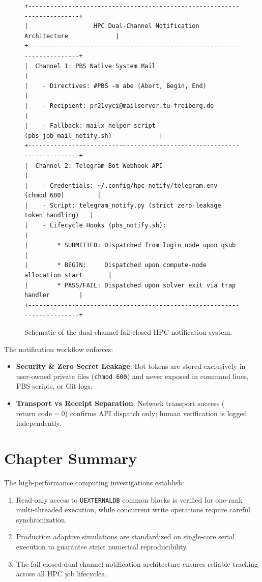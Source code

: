 \begin{figure}[htbp]
\centering
\small
\begin{verbatim}
+-------------------------------------------------------------------------+
|                  HPC Dual-Channel Notification Architecture             |
+-------------------------------------------------------------------------+
|  Channel 1: PBS Native System Mail                                      |
|    - Directives: #PBS -m abe (Abort, Begin, End)                        |
|    - Recipient: pr21vyci@mailserver.tu-freiberg.de                      |
|    - Fallback: mailx helper script (pbs_job_mail_notify.sh)             |
+-------------------------------------------------------------------------+
|  Channel 2: Telegram Bot Webhook API                                    |
|    - Credentials: ~/.config/hpc-notify/telegram.env (chmod 600)         |
|    - Script: telegram_notify.py (strict zero-leakage token handling)   |
|    - Lifecycle Hooks (pbs_notify.sh):                                   |
|        * SUBMITTED: Dispatched from login node upon qsub                |
|        * BEGIN:     Dispatched upon compute-node allocation start       |
|        * PASS/FAIL: Dispatched upon solver exit via trap handler        |
+-------------------------------------------------------------------------+
\end{verbatim}
\caption[Schematic of the dual-channel fail-closed HPC notification system.]{Schematic of the dual-channel fail-closed HPC notification system.}
\label{fig:notification_architecture}
\end{figure}

The notification workflow enforces:
\begin{itemize}
    \item \textbf{Security \& Zero Secret Leakage}: Bot tokens are stored exclusively in user-owned private files (\texttt{chmod 600}) and never exposed in command lines, PBS scripts, or Git logs.
    \item \textbf{Transport vs Receipt Separation}: Network transport success ($\text{return code} = 0$) confirms API dispatch only; human verification is logged independently.
\end{itemize}

\section{Chapter Summary}
\label{sec:hpc_summary}

The high-performance computing investigations establish:
\begin{enumerate}
    \item Read-only access to \texttt{UEXTERNALDB} common blocks is verified for one-rank multi-threaded execution, while concurrent write operations require careful synchronization.
    \item Production adaptive simulations are standardized on single-core serial execution to guarantee strict numerical reproducibility.
    \item The fail-closed dual-channel notification architecture ensures reliable tracking across all HPC job lifecycles.
\end{enumerate}
